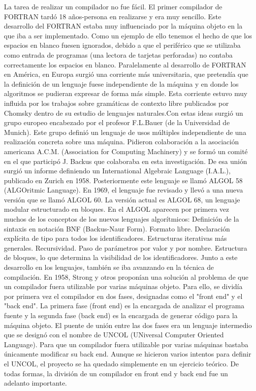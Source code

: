 La tarea de realizar un compilador no fue fácil. El primer compilador de FORTRAN tardó 18 años-persona en realizarse y era muy sencillo. Este desarrollo del FORTRAN estaba muy influenciado por la máquina objeto en la que iba a ser implementado. Como un ejemplo de ello tenemos el hecho de que los espacios en blanco fuesen ignorados, debido a que el periférico que se utilizaba como entrada de programas (una lectora de tarjetas perforadas) no contaba correctamente los espacios en blanco. Paralelamente al desarrollo de FORTRAN en América, en Europa surgió una corriente más universitaria, que pretendía que la definición de un lenguaje fuese independiente de la máquina y en donde los algoritmos se pudieran expresar de forma más simple.
Esta corriente estuvo muy influida por los trabajos sobre gramáticas de contexto libre publicados por Chomsky dentro de su estudio de lenguajes naturales.Con estas ideas surgió un grupo europeo encabezado por el profesor F.L.Bauer (de la Universidad de Munich). Este grupo definió un lenguaje de usos múltiples independiente de una realización concreta sobre una máquina. Pidieron colaboración a la asociación americana A.C.M. (Association for Computing Machinery) y se formó un comité en el que participó J. Backus que colaboraba en esta investigación. De esa unión surgió un informe definiendo un International Algebraic Language (I.A.L.), publicado en Zurich en 1958. Posteriormente este lenguaje se llamó ALGOL 58 (ALGOritmic Language). En 1969, el lenguaje fue revisado y llevó a una nueva versión que se llamó ALGOL 60. La versión actual es ALGOL 68, un lenguaje modular estructurado en bloques.
En el ALGOL aparecen por primera vez muchos de los conceptos de los nuevos lenguajes
algorítmicos:
Definición de la sintaxis en notación BNF (Backus-Naur Form).
Formato libre.
Declaración explícita de tipo para todos los identificadores.
Estructuras iterativas más generales.
Recursividad.
Paso de parámetros por valor y por nombre.
Estructura de bloques, lo que determina la visibilidad de los identificadores.
Junto a este desarrollo en los lenguajes, también se iba avanzando en la técnica de compilación. En 1958, Strong y otros proponían una solución al problema de que un compilador fuera utilizable por varias máquinas objeto. Para ello, se dividía por primera vez el compilador en dos fases, designadas como el "front end" y el "back end". La primera fase (front end) es la encargada de analizar el programa fuente y la segunda fase (back end) es la encargada de generar código para la máquina objeto. El puente de unión entre las dos fases era un lenguaje intermedio que se designó con el nombre de UNCOL (UNiversal Computer Oriented Language). Para que un compilador fuera utilizable por varias máquinas bastaba únicamente modificar su back end. Aunque se hicieron varios intentos para definir el UNCOL, el proyecto se ha quedado simplemente en un ejercicio teórico. De todas formas, la división de un compilador en front end y back end fue un adelanto importante.
